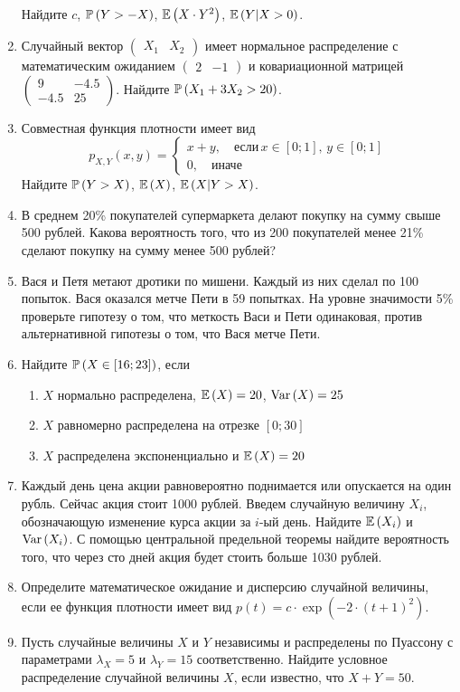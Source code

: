 \begin{enumerate}
Найдите  $c$,  $\P\left(Y>-X\right)$,  $\E\left(X\cdot Y^{2} \right)$,
$\E\left(Y|X>0\right)$.
\item Случайный вектор  $\left(\begin{array}{cc} {X_{1} } & {X_{2} } \end{array}\right)$
имеет нормальное распределение с математическим ожиданием $\left(\begin{array}{cc} {2}
& {-1} \end{array}\right)$ и ковариационной матрицей $\left(\begin{array}{cc} {9}
& {-4.5} \\ {-4.5} & {25} \end{array}\right)$.
Найдите $\P\left(X_{1} +3X_{2} >20\right)$.
\item Совместная функция плотности имеет вид
\[
p_{X,Y} \left(x,y\right)=\left\{\begin{array}{l} {x+y,\quad \text{если}\, x\in \left[0;1\right],\, y\in \left[0;1\right]} \\ {0,\quad \text{иначе}} \end{array}\right.
\]
Найдите  $\P\left(Y>X\right)$,  $\E\left(X\right)$,  $\E\left(X|Y>X\right)$.
\item В среднем 20\% покупателей супермаркета делают покупку на сумму свыше 500 рублей.
Какова вероятность того, что из 200 покупателей менее 21\% сделают покупку на сумму
менее 500 рублей?
\item Вася и Петя метают дротики по мишени. Каждый из них сделал по 100 попыток.
Вася оказался метче Пети в 59 попытках. На уровне значимости 5\% проверьте гипотезу
о том, что меткость Васи и Пети одинаковая, против альтернативной гипотезы о том,
что Вася метче Пети.
\item Найдите  $\P\left(X\in \left[16;23\right]\right)$, если
\begin{enumerate}
\item $X$  нормально распределена,  $\E\left(X\right)=20$,  $\Var\left(X\right)=25$
\item $X$  равномерно распределена на отрезке  $\left[0;30\right]$
\item $X$  распределена экспоненциально и  $\E\left(X\right)=20$
\end{enumerate}
\item Каждый день цена акции равновероятно поднимается или опускается на один рубль.
Сейчас акция стоит 1000 рублей. Введем случайную величину  $X_{i} $, обозначающую
изменение курса акции за  $i$-ый день. Найдите  $\E\left(X_{i} \right)$ и $\Var\left(X_{i} \right)$.
С помощью центральной предельной теоремы найдите вероятность того, что через сто
дней акция будет стоить больше 1030 рублей.
\item Определите математическое ожидание и дисперсию случайной величины, если ее
функция плотности имеет вид $p\left(t\right)=c\cdot \exp \left(-2\cdot \left(t+1\right)^{2} \right)$.
\item Пусть случайные величины $X$ и $Y$ независимы и распределены по Пуассону с
параметрами $\lambda _{X} =5$ и $\lambda _{Y} =15$ соответственно. Найдите условное
распределение случайной величины $X$, если известно, что $X+Y=50$.
\end{enumerate}

